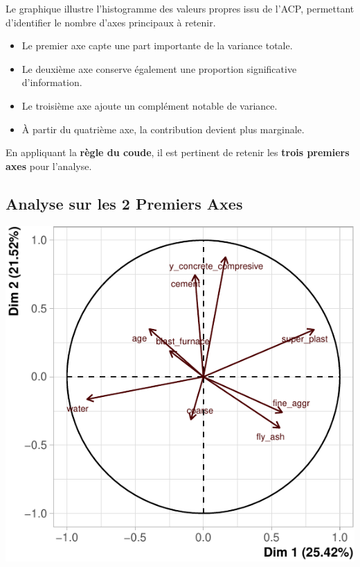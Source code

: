 \documentclass[
  12pt,
]{article}
\providecommand{\tightlist}{%
  \setlength{\itemsep}{0pt}\setlength{\parskip}{0pt}}
\begin{document}
Le graphique illustre l'histogramme des valeurs propres issu de l'ACP,
permettant d'identifier le nombre d'axes principaux à retenir.

\begin{itemize}
\tightlist
\item
  Le premier axe capte une part importante de la variance totale.
\item
  Le deuxième axe conserve également une proportion significative
  d'information.
\item
  Le troisième axe ajoute un complément notable de variance.
\item
  À partir du quatrième axe, la contribution devient plus marginale.
\end{itemize}

En appliquant la \textbf{règle du coude}, il est pertinent de retenir
les \textbf{trois premiers axes} pour l'analyse.

\subsection{Analyse sur les 2 Premiers
Axes}\label{analyse-sur-les-2-premiers-axes}

\begin{center}\includegraphics{rmd_final_files/figure-latex/unnamed-chunk-18-1} \end{center}
\end{document}
